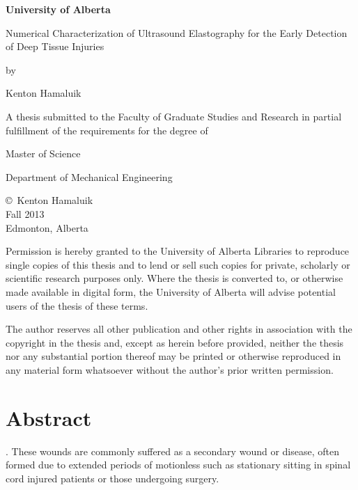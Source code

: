 \documentclass[10pt]{book}
\begin{document}
\begin{center}

{\fontsize{14pt}{1em}\selectfont \textbf{University of Alberta}}
\vspace{3em}

{\fontsize{13pt}{1em}\selectfont Numerical Characterization of Ultrasound Elastography for the Early Detection of Deep Tissue Injuries}
\vspace{2em}

{\fontsize{10pt}{1em} by}
\vspace{1em}

{\fontsize{13pt}{1em} Kenton Hamaluik}
\vspace{5em}

{\fontsize{11pt}{1em} A thesis submitted to the Faculty of Graduate Studies and Research in partial fulfillment of the requirements for the degree of}
\vspace{3em}

{\fontsize{13pt}{1em} Master of Science}
\vspace{4em}

{\fontsize{13pt}{1em} Department of Mechanical Engineering}
\vspace{5em}

{\fontsize{11pt}{1em}\copyright\ Kenton Hamaluik \\
Fall 2013 \\
Edmonton, Alberta}
\vfill

{\fontsize{9pt}{1em} Permission is hereby granted to the University of Alberta Libraries to reproduce single copies of this thesis and to lend or sell such copies for private, scholarly or scientific research purposes only. Where the thesis is converted to, or otherwise made available in digital form, the University of Alberta will advise potential users of the thesis of these terms.
\vspace{1em}

The author reserves all other publication and other rights in association with the copyright in the thesis and, except as herein before provided, neither the thesis nor any substantial portion thereof may be printed or otherwise reproduced in any material form whatsoever without the author's prior written permission.}
\end{center}

\chapter*{\centering Abstract}
\doublespacing

. These wounds are commonly suffered as a secondary wound or disease, often formed due to extended periods of motionless such as stationary sitting in spinal cord injured patients or those undergoing surgery.
\end{document}
